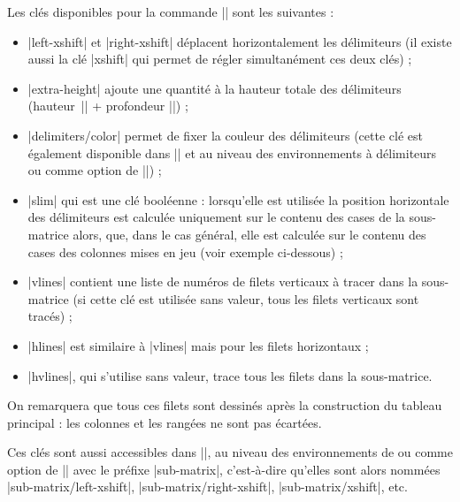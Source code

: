 \documentclass[dvipsnames]{article}%
\begin{document}
\medskip
Les clés disponibles pour la commande |\SubMatrix| sont les suivantes :
%
\begin{itemize}
\item |left-xshift| et |right-xshift| déplacent horizontalement les délimiteurs
(il existe aussi la clé |xshift| qui permet de régler simultanément ces deux
clés) ;
\item |extra-height| ajoute une quantité à la hauteur totale des délimiteurs
(hauteur~|\ht| + profondeur |\dp|) ;
\item |delimiters/color| permet de fixer la couleur des délimiteurs (cette clé
est également disponible dans |\NiceMatrixOptions| et au niveau des
environnements à délimiteurs ou comme option de |\CodeAfter|) ;
\item |slim| qui est une clé booléenne : lorsqu'elle est utilisée la position
horizontale des délimiteurs est calculée uniquement sur le contenu des cases
de la sous-matrice alors, que, dans le cas général, elle est calculée sur le
contenu des cases des colonnes mises en jeu (voir exemple ci-dessous) ;
\item |vlines| contient une liste de numéros de filets verticaux à tracer dans
la sous-matrice (si cette clé est utilisée sans valeur, tous les filets
verticaux sont tracés) ;
\item |hlines| est similaire à |vlines| mais pour les filets horizontaux ;
\item |hvlines|, qui s'utilise sans valeur, trace tous les filets dans la sous-matrice.
\end{itemize}
On remarquera que tous ces filets sont dessinés après la construction du tableau
principal : les colonnes et les rangées ne sont pas écartées.

\medskip
Ces clés sont aussi accessibles dans |\NiceMatrixOptions|, au niveau des
environnements de  ou comme option de |\CodeAfter| avec le
préfixe |sub-matrix|, c'est-à-dire qu'elles sont alors nommées
|sub-matrix/left-xshift|, |sub-matrix/right-xshift|, |sub-matrix/xshift|, etc.
\end{document}
